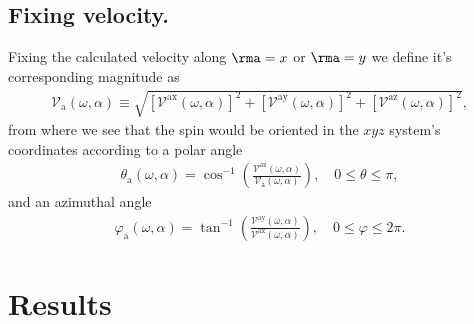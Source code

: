 \documentclass[floatfix,prb,aps,superscriptaddress,showpacs,11pt,preprint,letterpaper]{revtex4}
\begin{document}


\subsection{Fixing velocity.}\label{sec:theory-fixvel}

Fixing the calculated velocity along $\rma=x$ or $\rma=y$
 we define it's corresponding magnitude as
\begin{align}
\mathcal{V}_{\mathrm{a}}(\omega,\alpha) \equiv 
\sqrt { 
[\mathcal{V}^{\mathrm{ax}}(\omega,\alpha)]^{2} +
[\mathcal{V}^{\mathrm{ay}}(\omega,\alpha)]^{2} +
[\mathcal{V}^{\mathrm{az}}(\omega,\alpha)]^{2} 
},
\label{eq:vv-mag}
\end{align}
from where we see that the spin would be oriented
in the $xyz$ system's coordinates
according to a polar angle
\begin{align}
\theta_{\mathrm{a}}  (\omega,\alpha)
= 
\cos^{-1} \left( \frac{\mathcal{V}^{\mathrm{az}}(\omega,\alpha)}
{\mathcal{V}_{\mathrm{a}}(\omega,\alpha)} \right),
 \quad 0 \leq \theta \leq \pi, 
\label{eq:polar-ang}
\end{align}
and an azimuthal angle
\begin{align}
\varphi_{\mathrm{a}} (\omega,\alpha)
=
\tan^{-1} \left( \frac{\mathcal{V}^{\mathrm{ay}}(\omega,\alpha)}
{\mathcal{V}^{\mathrm{ax}}(\omega,\alpha)} \right),
\quad 0 \leq \varphi \leq 2\pi.
\label{eq:azimuthal-ang} 
\end{align} 



\section{Results} %
\label{sec:results}
\end{document}
